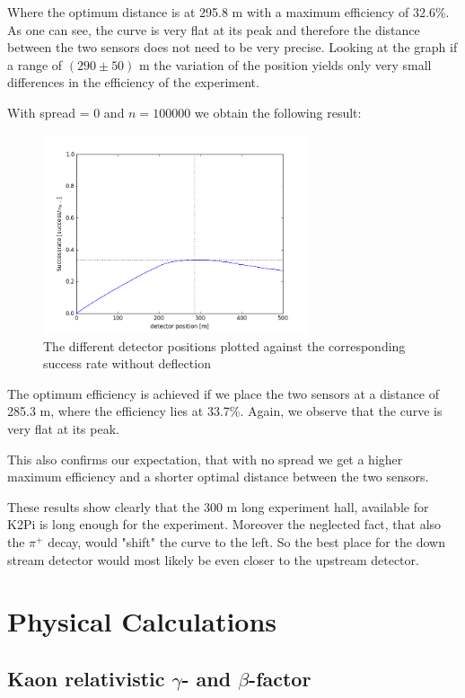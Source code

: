 \documentclass[a4paper,parskip,11pt, DIV12]{scrreprt}
\begin{document}
Where the optimum distance is at 295.8 m with a maximum efficiency of 32.6\%. As one can see, the curve is very flat at its peak and therefore the distance between the two sensors does not need to be very precise. Looking at the graph if a range of $(290 \pm 50)$ m the variation of the position yields only very small differences in the efficiency of the experiment.

With spread = 0 and $n = 100000$ we obtain the following result:

\begin{figure}[h] 
\centering
\includegraphics[width=0.7\textwidth]{Simulation100kNoSpread.png} 
\caption{The different detector positions plotted against the corresponding success rate without deflection}   
\end{figure}

The optimum efficiency is achieved if we place the two sensors at a distance of 285.3 m, where the efficiency lies at 33.7\%. Again, we observe that the curve is very flat at its peak. 

This also confirms our expectation, that with no spread we get a higher maximum efficiency and a shorter optimal distance between the two sensors.

These results show clearly that the 300 m long experiment hall, available for K2Pi is long enough for the experiment. Moreover the neglected fact, that also the $\pi^+$ decay, would "shift" the curve to the left. So the best place for the down stream detector would most likely be even closer to the upstream detector. 

\clearpage

\chapter{Physical Calculations}

\section{Kaon relativistic $\gamma$- and $\beta$-factor} \label{sec:gammabeta}
\end{document}
